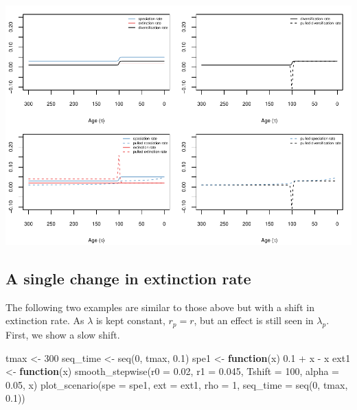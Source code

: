 \documentclass[
]{article}
\newenvironment{Shaded}{\begin{snugshade}}{\end{snugshade}}
\newcommand{\AttributeTok}[1]{\textcolor[rgb]{0.77,0.63,0.00}{#1}}
\newcommand{\ControlFlowTok}[1]{\textcolor[rgb]{0.13,0.29,0.53}{\textbf{#1}}}
\newcommand{\DecValTok}[1]{\textcolor[rgb]{0.00,0.00,0.81}{#1}}
\newcommand{\FloatTok}[1]{\textcolor[rgb]{0.00,0.00,0.81}{#1}}
\newcommand{\FunctionTok}[1]{\textcolor[rgb]{0.00,0.00,0.00}{#1}}
\newcommand{\NormalTok}[1]{#1}
\newcommand{\OtherTok}[1]{\textcolor[rgb]{0.56,0.35,0.01}{#1}}
\newcommand{\SpecialCharTok}[1]{\textcolor[rgb]{0.00,0.00,0.00}{#1}}
\begin{document}
\includegraphics{supplement_files/figure-latex/unnamed-chunk-7-1.pdf}

\pagebreak

\hypertarget{a-single-change-in-extinction-rate}{%
\subsection{A single change in extinction
rate}\label{a-single-change-in-extinction-rate}}

The following two examples are similar to those above but with a shift
in extinction rate. As \(\lambda\) is kept constant, \(r_p = r\), but an
effect is still seen in \(\lambda_p\). First, we show a slow shift.

\begin{Shaded}
\begin{Highlighting}[]
\NormalTok{tmax }\OtherTok{\textless{}{-}} \DecValTok{300}
\NormalTok{seq\_time }\OtherTok{\textless{}{-}} \FunctionTok{seq}\NormalTok{(}\DecValTok{0}\NormalTok{, tmax, }\FloatTok{0.1}\NormalTok{)}
\NormalTok{spe1 }\OtherTok{\textless{}{-}} \ControlFlowTok{function}\NormalTok{(x) }\FloatTok{0.1} \SpecialCharTok{+}\NormalTok{ x }\SpecialCharTok{{-}}\NormalTok{ x}
\NormalTok{ext1 }\OtherTok{\textless{}{-}} \ControlFlowTok{function}\NormalTok{(x) }\FunctionTok{smooth\_stepwise}\NormalTok{(}\AttributeTok{r0 =} \FloatTok{0.02}\NormalTok{, }\AttributeTok{r1 =} \FloatTok{0.045}\NormalTok{, }\AttributeTok{Tshift =} \DecValTok{100}\NormalTok{,}
    \AttributeTok{alpha =} \FloatTok{0.05}\NormalTok{, x)}
\FunctionTok{plot\_scenario}\NormalTok{(}\AttributeTok{spe =}\NormalTok{ spe1, }\AttributeTok{ext =}\NormalTok{ ext1, }\AttributeTok{rho =} \DecValTok{1}\NormalTok{, }\AttributeTok{seq\_time =} \FunctionTok{seq}\NormalTok{(}\DecValTok{0}\NormalTok{,}
\NormalTok{    tmax, }\FloatTok{0.1}\NormalTok{))}
\end{Highlighting}
\end{Shaded}
\end{document}

